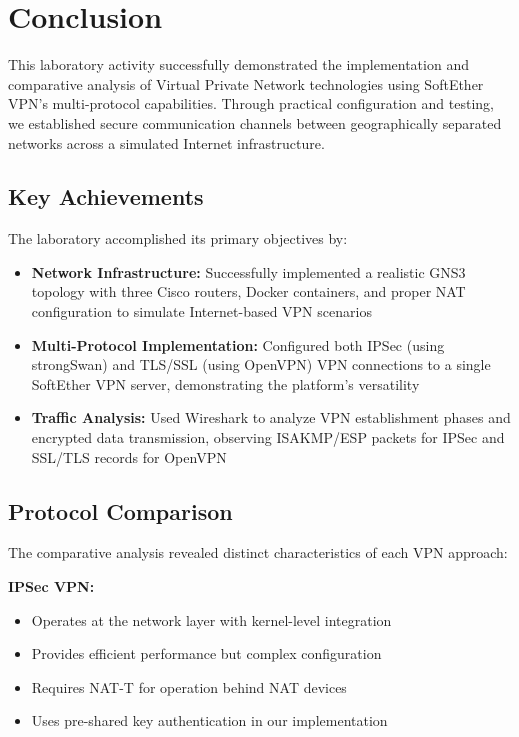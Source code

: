 \newpage

\section{Conclusion}

This laboratory activity successfully demonstrated the implementation and comparative analysis of Virtual Private Network technologies using SoftEther VPN's multi-protocol capabilities. Through practical configuration and testing, we established secure communication channels between geographically separated networks across a simulated Internet infrastructure.

\subsection{Key Achievements}

The laboratory accomplished its primary objectives by:

\begin{itemize}
    \item \textbf{Network Infrastructure:} Successfully implemented a realistic GNS3 topology with three Cisco routers, Docker containers, and proper NAT configuration to simulate Internet-based VPN scenarios
    
    \item \textbf{Multi-Protocol Implementation:} Configured both IPSec (using strongSwan) and TLS/SSL (using OpenVPN) VPN connections to a single SoftEther VPN server, demonstrating the platform's versatility
    
    \item \textbf{Traffic Analysis:} Used Wireshark to analyze VPN establishment phases and encrypted data transmission, observing ISAKMP/ESP packets for IPSec and SSL/TLS records for OpenVPN
\end{itemize}

\subsection{Protocol Comparison}

The comparative analysis revealed distinct characteristics of each VPN approach:

\textbf{IPSec VPN:}
\begin{itemize}
    \item Operates at the network layer with kernel-level integration
    \item Provides efficient performance but complex configuration
    \item Requires NAT-T for operation behind NAT devices
    \item Uses pre-shared key authentication in our implementation
\end{itemize}

